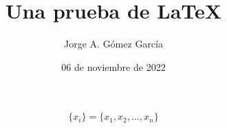 \documentclass[12pt]{article}
\title{Una prueba de \LaTeX}
\author{Jorge A. Gómez García}
\date{06 de noviembre de 2022}
\begin{document}
\maketitle

\begin{equation}
    \{x_i\} = \{x_1, x_2, \ldots, x_n\}
\end{equation}
\end{document}
